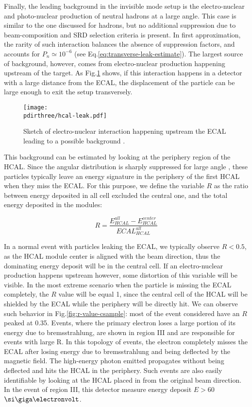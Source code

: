 Finally, the leading background in the invisible mode setup is the electro-nuclear and photo-nuclear production of neutral hadrons at a large angle. This case is similar to the one discussed for hadrons, but no additional suppression due to beam-composition and SRD selection criteria is present. In first approximation, the rarity of such interaction balances the absence of suppression factors, and accounts for $P_n \simeq 10^{-6}$ (see Eq.\ref{eq:transverse-leak-estimate}).
The largest source of background, however, comes from electro-nuclear production happening upstream of the target. As Fig.\ref{fig:eh-prod-sketch} shows, if this interaction happens in a detector with a large distance from the ECAL, the displacement of the particle can be large enough to exit the setup transversely. 


\begin{figure}[bth!]
  \centering
  \texttt{[image: \\pdirthree/hcal-leak.pdf]}
  \caption[upstream electro-hadron production upstream]{Sketch of electro-nuclear interaction happening upstream the ECAL leading to a possible background \cite{pdegen-thesis}.}
  \label{fig:eh-prod-sketch}
\end{figure}

This background can be estimated by looking at the periphery region of the HCAL. Since the angular distribution is sharply suppressed for large angle \cite{AUTIERO1998285,GNINENKO1998583}, these particles typically leave an energy signature in the periphery of the first HCAL when they miss the ECAL. For this purpose, we define the variable $R$ as the ratio between energy deposited in all cell excluded the central one, and the total energy deposited in the modules:

\begin{equation}
  \label{eq:R-factor}
  R = \frac{E^{all}_{HCAL} - E^{center}_{HCAL}}{ECAL^{all}_{HCAL}}
\end{equation}

In a normal event with particles leaking the ECAL, we typically observe $R<0.5$, as the HCAL module center is aligned with the beam direction, thus the dominating energy deposit will be in the central cell. If an electro-nuclear production happens upstream however, some distortion of this variable will be visible. In the most extreme scenario when the particle is missing the ECAL completely, the $R$ value will be equal 1, since the central cell of the HCAL will be shielded by the ECAL while the periphery will be directly hit. We can observe such behavior in Fig.\ref{fig:r-value-csample}: most of the event considered have an $R$ peaked at 0.35. Events, where the primary electron loses a large portion of its energy due to bremsstrahlung, are shown in region III and are responsible for events with large R. In this topology of events, the electron completely misses the ECAL after losing energy due to bremsstrahlung and being deflected by the magnetic field. The high-energy photon emitted propagates without being deflected and hits the HCAL in the periphery. Such events are also easily identifiable by looking at the HCAL placed in from the original beam direction. In the event of region III, this detector measure energy deposit $E>60$ $\gev$.


